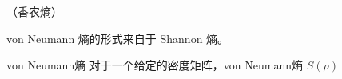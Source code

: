 
\begin{issues}
\issueTODO
\issueMissDepend（香农熵）
\issueDraft
\end{issues}


von Neumann 熵的形式来自于 Shannon 熵。

\begin{definition}{von Neumann熵}
对于一个给定的密度矩阵，von Neumann熵 $S\left(\rho\right)$
\end{definition}